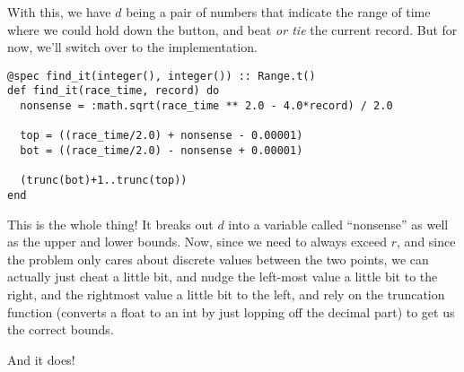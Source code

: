 \documentclass{article}
\begin{document}
With this, we have $d$ being a pair of numbers that indicate the range of time where we could hold down the button, and beat \emph{or tie} the current record. But for now, we'll switch over to the implementation.

\begin{verbatim}
@spec find_it(integer(), integer()) :: Range.t()
def find_it(race_time, record) do
  nonsense = :math.sqrt(race_time ** 2.0 - 4.0*record) / 2.0

  top = ((race_time/2.0) + nonsense - 0.00001)
  bot = ((race_time/2.0) - nonsense + 0.00001)

  (trunc(bot)+1..trunc(top))
end
\end{verbatim}

This is the whole thing! It breaks out $d$ into a variable called ``nonsense'' as well as the upper and lower bounds. Now, since we need to always exceed $r$, and since the problem only cares about discrete values between the two points, we can actually just cheat a little bit, and nudge the left-most value a little bit to the right, and the rightmost value a little bit to the left, and rely on the truncation function (converts a float to an int by just lopping off the decimal part) to get us the correct bounds.

And it does!
\end{document}
